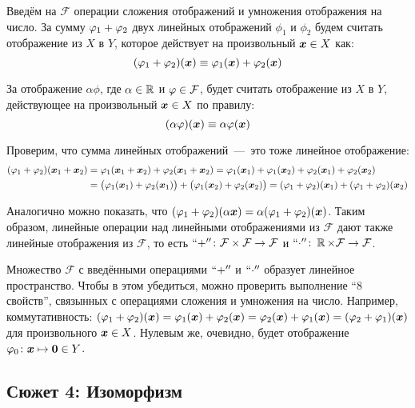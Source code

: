 \documentclass[a4paper,12pt]{article}
\begin{document}
  Введём на $\mathcal F$ операции сложения отображений и умножения отображения на число.
  За сумму $\phi_1 \hm+ \phi_2$ двух линейных отображений $\phi_1$ и $\phi_2$ будем считать отображение из $X$ в $Y$, которое действует на произвольный $\bds x \hm\in X$ как:
  \[
    (\varphi_1 + \varphi_2) (\boldsymbol x) \equiv \varphi_1(\boldsymbol x) + \varphi_2(\boldsymbol x)
  \]
  
  За отображение $\alpha\phi$, где $\alpha \hm\in \RR$ и $\phi \hm\in \mathcal F$, будет считать отображение из $X$ в $Y$, действующее на произвольный $\bds x \hm\in X$ по правилу:
  \[
    (\alpha \varphi) (\boldsymbol x) \equiv \alpha \varphi(\boldsymbol x)
  \]
  
  Проверим, что сумма линейных отображений~---~это тоже линейное отображение:
  \begin{equation*}
  \begin{split}
    (\varphi_1 + \varphi_2) (\boldsymbol x_1 + \boldsymbol x_2)
    &= \varphi_1 (\boldsymbol x_1 + \boldsymbol x_2) + \varphi_2 (\boldsymbol x_1 + \boldsymbol x_2)
    = \varphi_1 (\boldsymbol x_1) + \varphi_1 (\boldsymbol x_2) + \varphi_2 (\boldsymbol x_1) + \varphi_2 (\boldsymbol x_2) \\
    &= \bigl(\varphi_1(\boldsymbol x_1) + \varphi_2(\boldsymbol x_1)\bigr) + \bigl(\varphi_1(\boldsymbol x_2) + \varphi_2(\boldsymbol x_2)\bigr)
    = (\varphi_1 + \varphi_2) (\boldsymbol x_1) + (\varphi_1 + \varphi_2) (\boldsymbol x_2)
  \end{split}
  \end{equation*}
  
  Аналогично можно показать, что $(\phi_1 \hm+ \phi_2) (\alpha \bds x) \hm= \alpha (\phi_1 \hm+ \phi_2) (\bds x)$.
  Таким образом, линейные операции над линейными отображениями из $\mathcal F$ дают также линейные отображения из $\mathcal F$,
  то есть $``{+}''\colon \mathcal F \hm\times \mathcal F \hm\to \mathcal F$ и $``{\cdot}'' \colon \RR \hm\times \mathcal F \hm\to \mathcal F$.
  
  Множество $\mathcal F$ с введёнными операциями $``{+}''$ и $``{\cdot}''$ образует линейное пространство.
  Чтобы в этом убедиться, можно проверить выполнение ``$8$ свойств'', связынных с операциями сложения и умножения на число.
  Например, коммутативность: $(\phi_1 \hm+ \phi_2)(\bds x) \hm= \phi_1(\bds x) \hm+ \phi_2(\bds x) \hm= \phi_2(\bds x) \hm+ \phi_1(\bds x) \hm= (\phi_2 \hm+ \phi_1)(\bds x)$ для произвольного $\bds x \hm\in X$.
  Нулевым же, очевидно, будет отображение $\phi_0\colon \bds x \hm\mapsto \bds 0 \hm\in Y$.
  
  
  \subsection{Сюжет 4: Изоморфизм}
  \label{sec:iso}
  
\end{document}
